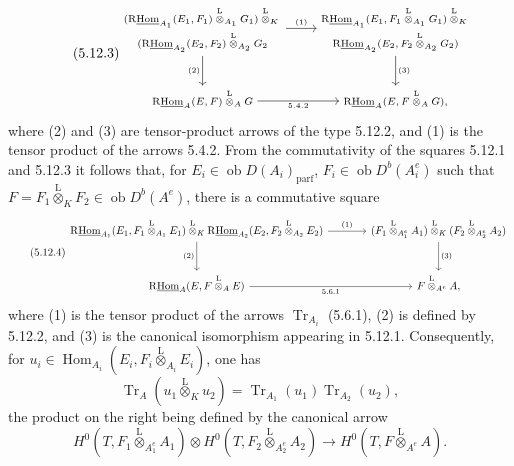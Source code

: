 \documentclass[11pt]{article}
\DeclareMathOperator{\Hom}{Hom}
\newcommand{\ob}{\operatorname{ob}}
\providecommand{\Tr}{\operatorname{Tr}}
\providecommand{\Tr}{\operatorname{Tr}}
\providecommand{\lten}{\overset{\mathrm L}{\otimes}}
\providecommand{\Tr}{\operatorname{Tr}}
\providecommand{\Hom}{\operatorname{Hom}}
\providecommand{\ob}{\operatorname{ob}}
\providecommand{\lten}{\overset{\mathrm L}{\otimes}}
\providecommand{\lten}{\overset{\mathrm L}{\otimes}}
\providecommand{\Tr}{\operatorname{Tr}}
\providecommand{\lten}{\overset{\mathrm L}{\otimes}}
\providecommand{\lten}{\overset{\mathrm L}{\otimes}}
\providecommand{\lten}{\overset{\mathrm L}{\otimes}}
\providecommand{\Hom}{\operatorname{Hom}}
\providecommand{\Tr}{\operatorname{Tr}}
\providecommand{\lten}{\overset{\mathrm L}{\otimes}}
\begin{document}
\begin{equation}\tag{5.12.3}
{\scriptsize
\begin{tikzcd}[column sep=2.8em,row sep=large]
\begin{gathered}
(\mathrm{R}\underline{\mathrm{Hom}}_{A_1}(E_1,F_1)\lten_{A_1}G_1)\lten_K{}\\[-.15em]
(\mathrm{R}\underline{\mathrm{Hom}}_{A_2}(E_2,F_2)\lten_{A_2}G_2
\end{gathered}
\arrow[r,"(1)"] \arrow[d,"(2)"']
&
\begin{gathered}
\mathrm{R}\underline{\mathrm{Hom}}_{A_1}(E_1,F_1\lten_{A_1}G_1)\lten_K{}\\[-.15em]
\mathrm{R}\underline{\mathrm{Hom}}_{A_2}(E_2,F_2\lten_{A_2}G_2)
\end{gathered}
\arrow[d,"(3)"]\\
\mathrm{R}\underline{\mathrm{Hom}}_A(E,F)\lten_AG \arrow[r,"5.4.2"'] & \mathrm{R}\underline{\mathrm{Hom}}_A(E,F\lten_AG),
\end{tikzcd}
}
\end{equation}
where (2) and (3) are tensor-product arrows of the type 5.12.2, and (1) is the tensor product of the arrows 5.4.2. From the commutativity of the squares 5.12.1 and 5.12.3 it follows that, for $E_i\in\ob D(A_i)_{\mathrm{parf}}$, $F_i\in\ob D^b(A_i^e)$ such that $F=F_1\lten_KF_2\in\ob D^b(A^e)$, there is a commutative square
\begin{equation}\tag{5.12.4}
\begin{tikzcd}[column sep=large,row sep=large]
\mathrm{R}\underline{\mathrm{Hom}}_{A_1}(E_1,F_1\lten_{A_1}E_1)\lten_K\mathrm{R}\underline{\mathrm{Hom}}_{A_2}(E_2,F_2\lten_{A_2}E_2) \arrow[r,"(1)"] \arrow[d,"(2)"'] & (F_1\lten_{A_1^e}A_1)\lten_K(F_2\lten_{A_2^e}A_2) \arrow[d,"(3)"]\\
\mathrm{R}\underline{\mathrm{Hom}}_A(E,F\lten_AE) \arrow[r,"5.6.1"'] & F\lten_{A^e}A,
\end{tikzcd}
\end{equation}
where (1) is the tensor product of the arrows $\Tr_{A_i}$ (5.6.1), (2) is defined by 5.12.2, and (3) is the canonical isomorphism appearing in 5.12.1. Consequently, for $u_i\in\Hom_{A_i}(E_i,F_i\lten_{A_i}E_i)$, one has
\begin{equation}\tag{5.12.5}
\Tr_A(u_1\lten_Ku_2)=\Tr_{A_1}(u_1)\Tr_{A_2}(u_2),
\end{equation}
the product on the right being defined by the canonical arrow
\[
H^0(T,F_1\lten_{A_1^e}A_1)\otimes H^0(T,F_2\lten_{A_2^e}A_2)
\longrightarrow H^0(T,F\lten_{A^e}A).
\]
\end{document}
